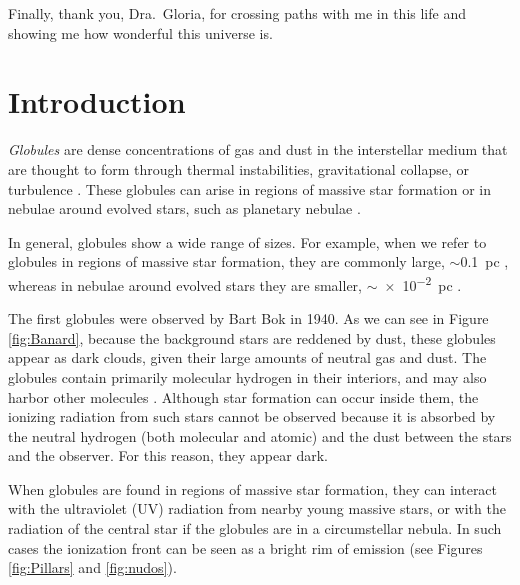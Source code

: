 \documentclass{book}
\begin{document}
Finally, thank you, Dra.~Gloria, for crossing paths with me in this
life and showing me how wonderful this universe is.

\newpage

\tableofcontents

\newpage

\chapter{Introduction}\label{Capitulo 1:introduccion}

\textit{Globules} are dense concentrations of gas and dust in the
interstellar medium that are thought to form through thermal
instabilities, gravitational collapse, or turbulence
\citep{Ballesteros:2011,Padoan:2002}. These globules can arise in
regions of massive star formation or in nebulae around evolved stars,
such as planetary nebulae \citep{O'Dell:2007}.

In general, globules show a wide range of sizes. For example, when we
refer to globules in regions of massive star formation, they are
commonly large, $\sim$\SI{0.1}{pc} \citep{Schenider:2016}, whereas in
nebulae around evolved stars they are smaller, $\sim$\SI{e-2}{pc}
\citep{GFGahm:2013}.

The first globules were observed by Bart Bok in 1940. As we can see in
Figure \ref{fig:Banard}, because the background stars are reddened by
dust, these globules appear as dark clouds, given their large amounts
of neutral gas and dust. The globules contain primarily molecular
hydrogen in their interiors, and may also harbor other molecules
\citep{Amin:2005, DFrancesco:2002}. Although star formation can occur
inside them, the ionizing radiation from such stars cannot be observed
because it is absorbed by the neutral hydrogen (both molecular and
atomic) and the dust between the stars and the observer. For this
reason, they appear dark.

When globules are found in regions of massive star formation, they can
interact with the ultraviolet (UV) radiation from nearby young massive
stars, or with the radiation of the central star if the globules are
in a circumstellar nebula. In such cases the ionization front can be
seen as a bright rim of emission (see Figures \ref{fig:Pillars} and
\ref{fig:nudos}).
\end{document}
